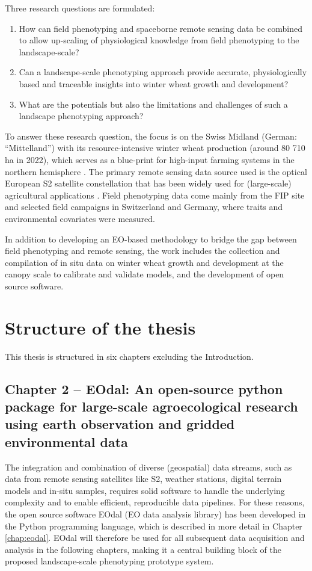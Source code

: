 Three research questions are formulated:

\begin{enumerate}
    \item How can field phenotyping and spaceborne remote sensing data be combined to allow up-scaling of physiological knowledge from field phenotyping to the landscape-scale?
    \item Can a landscape-scale phenotyping approach provide accurate, physiologically based and traceable insights into winter wheat growth and development?
    \item What are the potentials but also the limitations and challenges of such a landscape phenotyping approach?
\end{enumerate}

To answer these research question, the focus is on the Swiss Midland (German: ``Mittelland'') with its resource-intensive winter wheat production (around 80 710 ha in 2022), which serves as a blue-print for high-input farming systems in the northern hemisphere \citep{monfreda_farming_2008}. The primary remote sensing data source used is the optical European \gls{S2} satellite constellation that has been widely used for (large-scale) agricultural applications \citep{frampton_evaluating_2013,  veloso_understanding_2017, clevers_using_2017, perich_pixel-based_2022}. Field phenotyping data come mainly from the FIP site \citep{kirchgessner_eth_2017} and selected field campaigns in Switzerland and Germany, where traits and environmental covariates were measured.

In addition to developing an \gls{EO}-based methodology to bridge the gap between field phenotyping and remote sensing, the work includes the collection and compilation of in situ data on winter wheat growth and development at the canopy scale to calibrate and validate models, and the development of open source software.

\section{Structure of the thesis}

This thesis is structured in six chapters excluding the Introduction.

\subsection*{Chapter 2 -- EOdal: An open-source python package for large-scale agroecological research using earth observation and gridded environmental data}
The integration and combination of diverse (geospatial) data streams, such as data from remote sensing satellites like \gls{S2}, weather stations, digital terrain models and in-situ samples, requires solid software to handle the underlying complexity and to enable efficient, reproducible data pipelines. For these reasons, the open source software EOdal (\gls{EO} data analysis library) has been developed in the Python programming language, which is described in more detail in Chapter \ref{chap:eodal}. EOdal will therefore be used for all subsequent data acquisition and analysis in the following chapters, making it a central building block of the proposed landscape-scale phenotyping prototype system.

